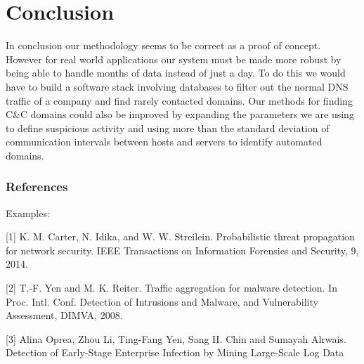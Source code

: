 \documentclass{article} %
\begin{document}
\section{Conclusion}
\label{conclusion}
In conclusion our methodology seems to be correct as a proof of concept. However for real world applications our system must be made more robust by being able to handle months of data instead of just a day. To do this we would have to build a software stack involving databases to filter out the normal DNS traffic of a company and find rarely contacted domains. Our methods for finding C\&C domains could also be improved by expanding the parameters we are using to define suspicious activity and using more than the standard deviation of communication intervals between hosts and servers to identify automated domains.


\subsubsection*{References}
Examples: \\

\small{
[1] K. M. Carter, N. Idika, and W. W. Streilein. Probabilistic threat propagation for network security. IEEE Transactions on Information Forensics and Security, 9, 2014.

[2] T.-F. Yen and M. K. Reiter. Traffic aggregation for malware detection. In
Proc. Intl. Conf. Detection of Intrusions and Malware, and Vulnerability Assessment, DIMVA, 2008.

[3] Alina Oprea, Zhou Li, Ting-Fang Yen, Sang H. Chin and Sumayah Alrwais. Detection of Early-Stage Enterprise Infection by Mining Large-Scale Log Data
}
\end{document}
